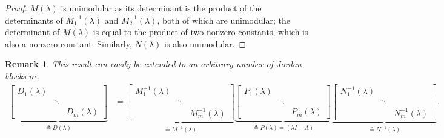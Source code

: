 \documentclass[11pt]{article}
\newtheorem*{remark}{Remark}
\begin{document}
\begin{proof}
$M(\lambda)$ is unimodular as its determinant is the product of the determinants of $M_1^{-1}(\lambda)$ and $M_2^{-1}(\lambda)$, both of which are unimodular; the determinant of $M(\lambda)$ is equal to the product of two nonzero constants, which is also a nonzero constant.
Similarly, $N(\lambda)$ is also unimodular.
\end{proof}

\begin{remark}
This result can easily be extended to an arbitrary number of Jordan blocks \(m\).
\begin{align}
\label{a4}
\underbrace{\begin{bmatrix}
D_1(\lambda) & &\\
& \ddots &\\
& & D_m(\lambda)
\end{bmatrix} }_{\triangleq D(\lambda)}
&=
\underbrace{\begin{bmatrix}
M_1^{-1}(\lambda) & &\\
& \ddots &\\
& & M_m^{-1}(\lambda)
\end{bmatrix}}_{\triangleq M^{-1}(\lambda)}
\underbrace{\begin{bmatrix}
P_1(\lambda) & &\\
& \ddots &\\
& & P_m(\lambda)
\end{bmatrix}}_{\triangleq P(\lambda) = (\lambda I - A)}
\underbrace{\begin{bmatrix}
N_1^{-1}(\lambda) & &\\
& \ddots &\\
& & N_m^{-1}(\lambda)
\end{bmatrix}}_{\triangleq N^{-1}(\lambda)}.
\end{align}
\end{remark}
\end{document}
